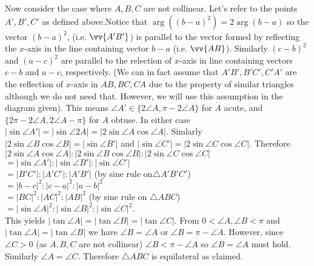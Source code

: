 \documentclass[11pt]{article}
\begin{document}
\begin{enumerate}

Now consider the case where $A,B,C$ are not collinear. Let's refer to the points $A', B', C'$ as defined above.Notice that $\arg ((b-a)^2)=2\arg (b-a)$ so the vector $(b-a)^2$, (i.e. $\vv{A'B'}$) is parallel to the vector formed by reflecting the $x$-axis in the line containing vector $b-a$ (i.e. $\vv{AB}$). Similarly $(c-b)^2$ and $(a-c)^2$ are parallel to the relection of $x$-axis in line containing vectors $c-b$ and $a-c$, respectively. (We can in fact assume that $A'B', B'C', C'A'$ are the reflection of $x$-axis in $AB, BC, CA$ due to the property of similar triangles although we do not need that. However, we will use this assumption in the diagram given). This means 
$\angle A'\in \{2\angle A, \pi -2\angle A\}$ for $A$ acute, and $\{2\pi-2\angle A, 2\angle A-\pi\}$ for $A$ obtuse. In either case $|\sin\angle A'|=|\sin\angle 2A|=|2\sin\angle A\cos\angle A|$. Simlarly $|2\sin\angle B\cos\angle B|=|\sin\angle B'|$ and $|\sin\angle C'|=|2\sin\angle C\cos\angle C|$. Therefore $|2\sin\angle A\cos\angle A|:|2\sin\angle B\cos\angle B|:|2\sin\angle C\cos\angle C|$\\
$=|\sin\angle A'|:|\sin\angle B'|:|\sin\angle C'|$\\
$=|B'C'|:|A'C'|:|A'B'|$ (by sine rule on$\triangle A'B'C'$)\\
$=|b-c|^2:|c-a|^2:|a-b|^2$\\
$=|BC|^2:|AC|^2:|AB|^2$ (by sine rule on $\triangle ABC$)\\
$=|\sin\angle A|^2:|\sin\angle B|^2:|\sin\angle C|^2$.\\
This yields $|\tan\angle A|=|\tan\angle B|=|\tan\angle C|$. From $0<\angle A, \angle B<\pi$ and $|\tan\angle A|=|\tan\angle B|$ we have $\angle B=\angle A$ or $\angle B=\pi-\angle A$. However, since $\angle C>0$ (as $A,B,C$ are not collinear) $\angle B<\pi-\angle A$ so $\angle B=\angle A$ must hold. Similarly $\angle A=\angle C$. Therefore $\triangle ABC$ is equilateral as claimed.

\end{enumerate}
\end{document}
